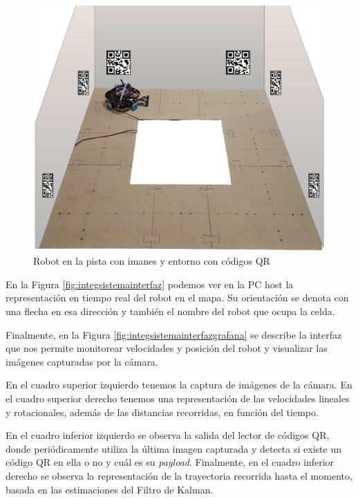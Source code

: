 \begin{figure}[H]
    \centering
    \includegraphics[width=0.75\linewidth]{images/integ_sistema_robot_en_plano.png}
    \caption{Robot en la pista con imanes y entorno con códigos QR}
    \label{fig:integsistemarobotpistaqr}
\end{figure}

En la Figura \ref{fig:integsistemainterfaz} podemos ver en la PC host la representación en tiempo real del robot en el mapa. Su orientación se denota con una flecha en esa dirección y también el nombre del robot que ocupa la celda.

Finalmente, en la Figura \ref{fig:integsistemainterfazgrafana} se describe la interfaz que nos permite monitorear velocidades y posición del robot y visualizar las imágenes capturadas por la cámara.

En el cuadro superior izquierdo tenemos la captura de imágenes de la cámara. En el cuadro superior derecho tenemos una representación de las velocidades lineales y rotacionales, además de las distancias recorridas, en función del tiempo.

En el cuadro inferior izquierdo se observa la salida del lector de códigos QR, donde periódicamente utiliza la última imagen capturada y detecta si existe un código QR en ella o no y cuál es su \textit{payload}. Finalmente, en el cuadro inferior derecho se observa la representación de la trayectoria recorrida hasta el momento, basada en las estimaciones del Filtro de Kalman.

